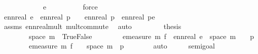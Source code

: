 \begin{isabellebody}
\ \ \ \ \ \ \ \ \ \ \ \ {\isacartoucheopen}e\ {\isachargreater}{\kern0pt}\ {}{\isacartoucheclose}\isanewline
\ \ \ \ \ \ \isamarkupfalse%
\ force\isanewline
\ \ \ \ \isamarkupfalse%
\ \isamarkupfalse%
\ {\isachardoublequoteopen}ennreal\ e\ {\isacharasterisk}{\kern0pt}\ ennreal\ {\isacharparenleft}{\kern0pt}{}{\isacharminus}{\kern0pt}p{}{\isacharparenright}{\kern0pt}\ {\isacharplus}{\kern0pt}\ {}\ {\isacharasterisk}{\kern0pt}\ ennreal\ p{}\ {\isacharequal}{\kern0pt}\ ennreal\ {\isacharparenleft}{\kern0pt}{\isacharparenleft}{\kern0pt}{}{\isacharminus}{\kern0pt}p{}{\isacharparenright}{\kern0pt}{\isacharasterisk}{\kern0pt}e{\isacharparenright}{\kern0pt}{\isachardoublequoteclose}\isanewline
\ \ \ \ \ \ \isamarkupfalse%
\ assms{\isacharparenleft}{\kern0pt}{}{\isacharparenright}{\kern0pt}\ ennreal{\isacharunderscore}{\kern0pt}mult{\isacharprime}{\kern0pt}\ mult{\isachardot}{\kern0pt}commute\ \isamarkupfalse%
\ auto\isanewline
\ \ \ \ \isamarkupfalse%
\ \ \isamarkupfalse%
\ {\isacharquery}{\kern0pt}thesis\isanewline
\ \ \ \ \ \ \isamarkupfalse%
\ \isanewline
\ \ \ \ \ \ \ \ {\isacartoucheopen}space\ m\ {\isacharequal}{\kern0pt}\ {\isacharbraceleft}{\kern0pt}True{\isacharcomma}{\kern0pt}False{\isacharbraceright}{\kern0pt}{\isacartoucheclose}\isanewline
\ \ \ \ \ \ \ \ {\isacartoucheopen}emeasure\ m\ {\isacharparenleft}{\kern0pt}f\ {\isacharminus}{\kern0pt}{\isacharbackquote}{\kern0pt}\ {\isacharbraceleft}{\kern0pt}ennreal\ e{\isacharbraceright}{\kern0pt}\ {\isasyminter}\ space\ m{\isacharparenright}{\kern0pt}\ {\isacharequal}{\kern0pt}\ {}\ {\isacharminus}{\kern0pt}\ p{}{\isacartoucheclose}\isanewline
\ \ \ \ \ \ \ \ {\isacartoucheopen}emeasure\ m\ {\isacharparenleft}{\kern0pt}f\ {\isacharminus}{\kern0pt}{\isacharbackquote}{\kern0pt}\ {\isacharbraceleft}{\kern0pt}{}{\isacharbraceright}{\kern0pt}\ {\isasyminter}\ space\ m{\isacharparenright}{\kern0pt}\ {\isacharequal}{\kern0pt}\ p{}{\isacartoucheclose}\isanewline
\ \ \ \ \ \ \isamarkupfalse%
\ auto\isanewline
\ \ \isamarkupfalse%
\isanewline
{}\isamarkupfalse%
%
\endisatagproof
{\isafoldproof}%
%
\isadelimproof
\isanewline
%
\endisadelimproof
\isanewline
\ \isamarkupfalse%
\ semi{\isacharunderscore}{\kern0pt}goal{}{}{\isacharcolon}{\kern0pt}\isanewline

\end{isabellebody}
